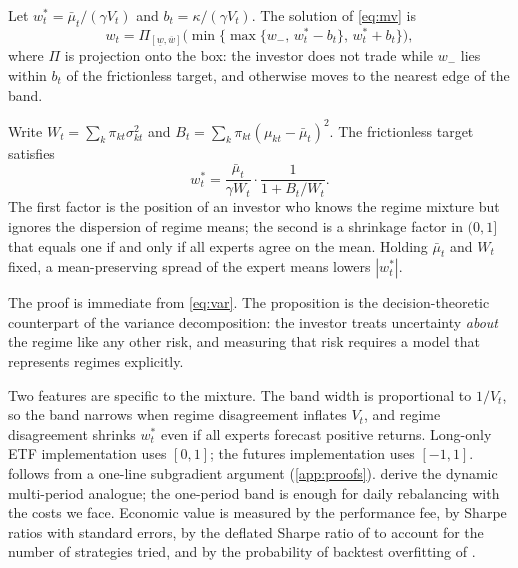\begin{proposition}\label{prop:band}
Let $w^\ast_t=\bar\mu_t/(\gamma V_t)$ and $b_t=\kappa/(\gamma V_t)$. The solution of \eqref{eq:mv} is
\begin{equation}
  w_t=\Pi_{[\underline w,\overline w]}\Big(\min\big\{\max\{w_-,\,w^\ast_t-b_t\},\,w^\ast_t+b_t\big\}\Big),
\end{equation}
where $\Pi$ is projection onto the box: the investor does not trade while $w_-$ lies within $b_t$ of
the frictionless target, and otherwise moves to the nearest edge of the band.
\end{proposition}

\begin{proposition}\label{prop:shrink}
Write $W_t=\sum_k\pi_{kt}\sigma^2_{kt}$ and $B_t=\sum_k\pi_{kt}(\mu_{kt}-\bar\mu_t)^2$. The frictionless
target satisfies
\begin{equation}
  w^\ast_t=\frac{\bar\mu_t}{\gamma W_t}\cdot\frac{1}{1+B_t/W_t}.
\end{equation}
The first factor is the position of an investor who knows the regime mixture but ignores the
dispersion of regime means; the second is a shrinkage factor in $(0,1]$ that equals one if and only if
all experts agree on the mean. Holding $\bar\mu_t$ and $W_t$ fixed, a mean-preserving spread of the
expert means lowers $|w^\ast_t|$.
\end{proposition}

\noindent The proof is immediate from \eqref{eq:var}. The proposition is the decision-theoretic
counterpart of the variance decomposition: the investor treats uncertainty \emph{about} the regime
like any other risk, and measuring that risk requires a model that represents regimes explicitly.

\noindent Two features are specific to the mixture. The band width is proportional to $1/V_t$, so the
band narrows when regime disagreement inflates $V_t$, and regime disagreement shrinks $w^\ast_t$ even
if all experts forecast positive returns. Long-only ETF implementation uses $[0,1]$; the futures
implementation uses $[-1,1]$.  follows from a one-line subgradient argument
(\cref{app:proofs}).
\citet{garleanu2013dynamic} derive the dynamic multi-period analogue; the one-period band is enough
for daily rebalancing with the costs we face. Economic value is measured by the
\citet{fleming2001economic} performance fee, by Sharpe ratios with \citet{lo2002statistics} standard
errors, by the deflated Sharpe ratio of \citet{bailey2014deflated} to account for the number of
strategies tried, and by the probability of backtest overfitting of \citet{bailey2017probability}.
